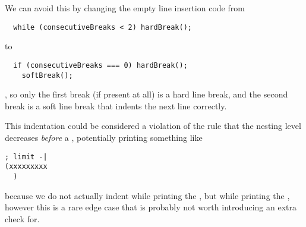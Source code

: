 We can avoid this by changing the
empty line insertion code from
\begin{verbatim}
  while (consecutiveBreaks < 2) hardBreak();
\end{verbatim}
to
\begin{verbatim}
  if (consecutiveBreaks === 0) hardBreak();
    softBreak();
\end{verbatim}
, so only the first break (if present at all) is a hard line break,
and the second break is a soft line break
that indents the next line correctly.

This indentation could be considered a violation of
the rule that the nesting level decreases \textit{before}
a , potentially printing something like
\begin{verbatim}
; limit -|
(xxxxxxxxx
  )
\end{verbatim}
because we do not actually indent while printing the ,
but while printing the ,
however this is a rare edge case
that is probably not worth introducing an extra check for.
